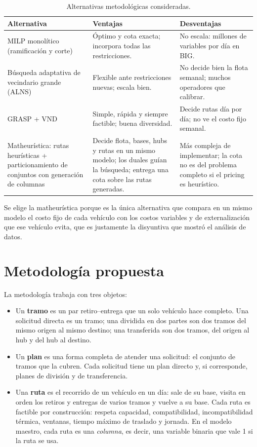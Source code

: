 \begin{table}[htbp]
\centering
\caption{Alternativas metodológicas consideradas.}\label{tab:alternativas}
\small
\begin{tabularx}{\textwidth}{>{\raggedright\arraybackslash}p{3.6cm}YY}
\toprule
Alternativa & Ventajas & Desventajas \\
\midrule
MILP monolítico (ramificación y corte) & Óptimo y cota exacta; incorpora todas las restricciones. & No escala: millones de variables por día en BIG. \\
Búsqueda adaptativa de vecindario grande (ALNS) & Flexible ante restricciones nuevas; escala bien. & No decide bien la flota semanal; muchos operadores que calibrar. \\
GRASP + VND & Simple, rápida y siempre factible; buena diversidad. & Decide rutas día por día; no ve el costo fijo semanal. \\
Matheurística: rutas heurísticas + particionamiento de conjuntos con generación de columnas & Decide flota, bases, hubs y rutas en un mismo modelo; los duales guían la búsqueda; entrega una cota sobre las rutas generadas. & Más compleja de implementar; la cota no es del problema completo si el pricing es heurístico. \\
\bottomrule
\end{tabularx}
\end{table}

Se elige la matheurística porque es la única alternativa que compara en un mismo modelo el costo fijo de cada vehículo con los costos variables y de externalización que ese vehículo evita, que es justamente la disyuntiva que mostró el análisis de datos.

\section{Metodología propuesta}\label{sec:propuesta}

 La metodología trabaja con tres objetos:
\begin{itemize}\itemsep0pt
\item Un \textbf{tramo} es un par retiro--entrega que un solo vehículo hace completo. Una solicitud directa es un tramo; una dividida en dos partes son dos tramos del mismo origen al mismo destino; una transferida son dos tramos, del origen al hub y del hub al destino.
\item Un \textbf{plan} es una forma completa de atender una solicitud: el conjunto de tramos que la cubren. Cada solicitud tiene un plan directo y, si corresponde, planes de división y de transferencia.
\item Una \textbf{ruta} es el recorrido de un vehículo en un día: sale de su base, visita en orden los retiros y entregas de varios tramos y vuelve a su base. Cada ruta es factible por construcción: respeta capacidad, compatibilidad, incompatibilidad térmica, ventanas, tiempo máximo de traslado y jornada. En el modelo maestro, cada ruta es una \emph{columna}, es decir, una variable binaria que vale 1 si la ruta se usa.
\end{itemize}

